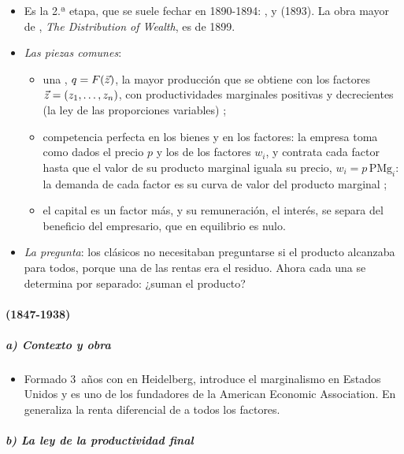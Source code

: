 \documentclass[11pt]{article}
\begin{document}
\begin{itemize}
\item Es la 2.ª etapa, que se suele fechar en 1890-1894\nocite{Fonseca2026Neoclassicals}: \textcite{Clark1891Distribution}, \textcite{Wicksteed1894Essay} y  (1893). La obra mayor de , \emph{The Distribution of Wealth}, es de 1899.
\item \emph{Las piezas comunes}:
  \begin{itemize}
  \item una , $q=F(\vec{z})$, la mayor producción que se obtiene con los factores $\vec{z}=(z_1,\dots,z_n)$, con productividades marginales positivas y decrecientes (la ley de las proporciones variables) ;
  \item competencia perfecta en los bienes y en los factores: la empresa toma como dados el precio $p$ y los de los factores $w_i$, y contrata cada factor hasta que el valor de su producto marginal iguala su precio, $w_i=p\,\mathrm{PMg}_i$: la demanda de cada factor es su curva de valor del producto marginal ;
  \item el capital es un factor más, y su remuneración, el interés, se separa del beneficio del empresario, que en equilibrio es nulo.
  \end{itemize}
\item \emph{La pregunta}: los clásicos no necesitaban preguntarse si el producto alcanzaba para todos, porque una de las rentas era el residuo. Ahora cada una se determina por separado: ¿suman el producto?
\end{itemize}

\paragraph{ (1847-1938)}

\subparagraph{a) Contexto y obra}

\begin{itemize}
\item Formado 3~años con  en Heidelberg\nocite{Clark1899Distribution}, introduce el marginalismo en Estados Unidos y es uno de los fundadores de la American Economic Association. En \textcite{Clark1891Distribution} generaliza la renta diferencial de  a todos los factores.
\end{itemize}

\subparagraph{b) La ley de la productividad final}
\end{document}

